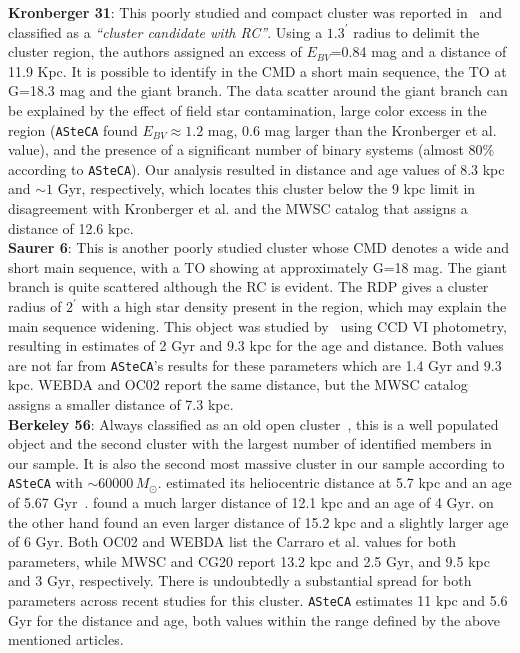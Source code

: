 \documentclass[referee]{aa}
\begin{document}
  \noindent \textbf{Kronberger 31}: This poorly studied and compact cluster was reported
  in~\cite{Kronberger_2006} and classified as a \emph{``cluster candidate with
  RC''}. Using a $1.3^{\prime}$ radius to delimit the cluster region, the authors
  assigned an excess of $E_{BV}$=0.84 mag and a distance of 11.9 Kpc.
  It is possible to identify in the CMD a short main sequence, the TO at G=18.3
  mag and the giant branch. The data scatter around the giant branch can be
  explained by the effect of field star contamination, large color excess in the
  region (\texttt{ASteCA} found $E_{BV}\approx1.2$ mag, 0.6 mag larger than the
  Kronberger et al. value), and the presence of a significant number of binary
  systems (almost 80\% according to \texttt{ASteCA}). Our analysis resulted in
  distance and age values of 8.3 kpc and $\sim1$ Gyr, respectively, which
  locates this cluster below the 9 kpc limit in disagreement with Kronberger et
  al. and the MWSC catalog that assigns a distance of 12.6 kpc.\\

  \noindent \textbf{Saurer 6}: This is another poorly studied cluster whose CMD denotes a
  wide and short main sequence, with a TO showing at approximately G=18 mag. The
  giant branch is quite scattered although the RC is evident.
  The RDP gives a cluster radius of $2^{\prime}$ with a high star density
  present in the region, which may explain the main sequence widening.
  This object was studied by~\cite{Frinchaboy_2002} using CCD VI photometry,
  resulting in estimates of 2 Gyr and 9.3 kpc for the age and distance.
  Both values are not far from \texttt{ASteCA}'s results for these parameters
  which are 1.4 Gyr and 9.3 kpc. WEBDA and OC02 report the same distance, but
  the MWSC catalog assigns a smaller distance of 7.3 kpc.\\

  \noindent \textbf{Berkeley 56}: Always classified as an old open
  cluster~\citep[see for example][]{King_1964}, this is a well populated object
  and the second cluster with the largest number of identified members in our
  sample. It is also the second most massive cluster in our sample according
  to \texttt{ASteCA} with $\sim60000\,M_{\odot}$.
  \cite{Janes_1994} estimated its heliocentric distance at 5.7 kpc and an age of
  5.67 Gyr~\citep[according to][]{Salaris_2004}. \cite{Carraro_2006} found a
  much larger distance of 12.1 kpc and an age of 4 Gyr. \cite{Janes_2011} on the
  other hand found an even larger distance of 15.2 kpc and a slightly larger age
  of 6 Gyr.
  Both OC02 and WEBDA list the Carraro et al. values for both parameters, while
  MWSC and CG20 report 13.2 kpc and 2.5 Gyr, and 9.5 kpc and 3
  Gyr, respectively. There is undoubtedly a substantial spread for both
  parameters across recent studies for this cluster.
  \texttt{ASteCA} estimates 11 kpc and 5.6 Gyr for the distance and age,
  both values within the range defined by the above mentioned articles.\\
\end{document}
